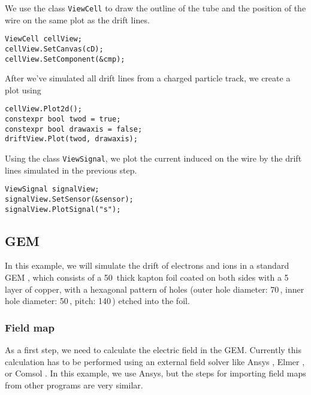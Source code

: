 We use the class \texttt{ViewCell} to draw the
outline of the tube and the position of the wire on the same plot as the
drift lines.
\begin{lstlisting}
ViewCell cellView;
cellView.SetCanvas(cD);
cellView.SetComponent(&cmp);
\end{lstlisting}
After we've simulated all drift lines from a charged particle 
track, we create a plot using
\begin{lstlisting}
cellView.Plot2d();
constexpr bool twod = true;
constexpr bool drawaxis = false;
driftView.Plot(twod, drawaxis);
\end{lstlisting}

Using the class \texttt{ViewSignal}, we plot the current induced on 
the wire by the drift lines simulated in the previous step.
\begin{lstlisting}
ViewSignal signalView;
signalView.SetSensor(&sensor);
signalView.PlotSignal("s");
\end{lstlisting}

\subsection{GEM}\label{Sec:ExampleGem}
In this example, we will simulate the drift of electrons and ions 
in a standard GEM \cite{Sauli2016}, 
which consists of a 50\, thick kapton foil 
coated on both sides with a 5\, layer of copper, 
with a hexagonal pattern of holes (outer hole diameter: 70\,, 
inner hole diameter: 50\,, pitch: 140\,) 
etched into the foil.
\subsubsection{Field map}
As a first step, we need to calculate the electric field in the GEM. 
Currently this calculation has to be performed using an external field 
solver like Ansys \cite{ANSYS}, Elmer \cite{Elmer}, or Comsol \cite{Comsol}.
In this example, 
we use Ansys, but the steps for importing field maps from other 
programs are very similar.

